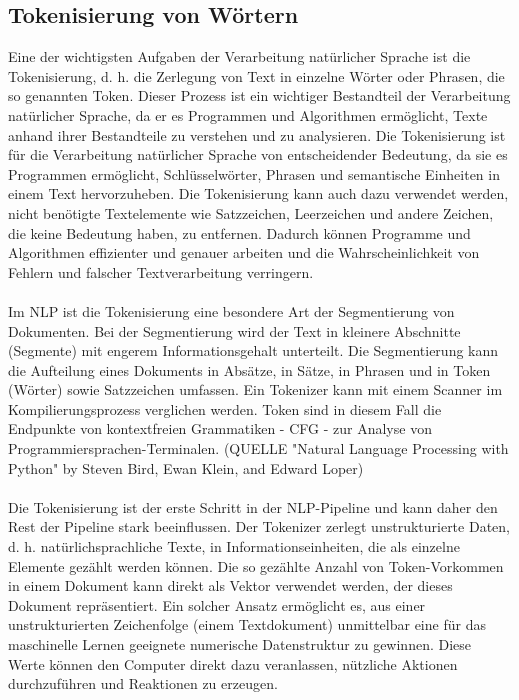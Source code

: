 \subsection{Tokenisierung von Wörtern}
Eine der wichtigsten Aufgaben der Verarbeitung natürlicher Sprache ist die Tokenisierung, d. h. die Zerlegung von Text in einzelne Wörter oder Phrasen, die so genannten Token. 
Dieser Prozess ist ein wichtiger Bestandteil der Verarbeitung natürlicher Sprache, da er es Programmen und Algorithmen ermöglicht, Texte anhand ihrer Bestandteile zu verstehen und zu analysieren. 
Die Tokenisierung ist für die Verarbeitung natürlicher Sprache von entscheidender Bedeutung, da sie es Programmen ermöglicht, Schlüsselwörter, Phrasen und semantische Einheiten in einem Text hervorzuheben. 
Die Tokenisierung kann auch dazu verwendet werden, nicht benötigte Textelemente wie Satzzeichen, Leerzeichen und andere Zeichen, die keine Bedeutung haben, zu entfernen. 
Dadurch können Programme und Algorithmen effizienter und genauer arbeiten und die Wahrscheinlichkeit von Fehlern und falscher Textverarbeitung verringern.\cite{jurafsky_speech_2009}\\\\
Im \ac{NLP} ist die Tokenisierung eine besondere Art der Segmentierung von Dokumenten. 
Bei der Segmentierung wird der Text in kleinere Abschnitte (Segmente) mit engerem Informationsgehalt unterteilt. 
Die Segmentierung kann die Aufteilung eines Dokuments in Absätze, in Sätze, in Phrasen und in Token (Wörter) sowie Satzzeichen umfassen. 
Ein Tokenizer kann mit einem Scanner im Kompilierungsprozess verglichen werden. 
Token sind in diesem Fall die Endpunkte von kontextfreien Grammatiken - \ac{CFG} - zur Analyse von Programmiersprachen-Terminalen. (QUELLE "Natural Language Processing with Python" by Steven Bird, Ewan Klein, and Edward Loper)\\\\
Die Tokenisierung ist der erste Schritt in der \ac{NLP}-Pipeline und kann daher den Rest der Pipeline stark beeinflussen. 
Der Tokenizer zerlegt unstrukturierte Daten, d. h. natürlichsprachliche Texte, in Informationseinheiten, die als einzelne Elemente gezählt werden können. 
Die so gezählte Anzahl von Token-Vorkommen in einem Dokument kann direkt als Vektor verwendet werden, der dieses Dokument repräsentiert. 
Ein solcher Ansatz ermöglicht es, aus einer unstrukturierten Zeichenfolge (einem Textdokument) unmittelbar eine für das maschinelle Lernen geeignete numerische Datenstruktur zu gewinnen. 
Diese Werte können den Computer direkt dazu veranlassen, nützliche Aktionen durchzuführen und Reaktionen zu erzeugen.\cite{lane_natural_2019}\\\\
